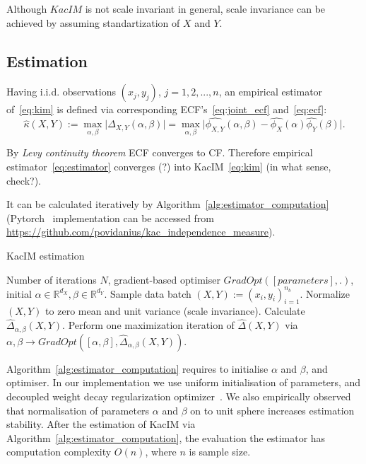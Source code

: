 \documentclass{article}
\begin{document}
Although $KacIM$ is not scale invariant in general, scale invariance can be achieved by assuming standartization of $X$ and $Y$.


\subsection{Estimation}

Having i.i.d. observations $(x_{j}, y_{j})$, $j = 1,2,...,n$, an empirical estimator of~\eqref{eq:kim} is defined via corresponding ECF's~\eqref{eq:joint_ecf} and~\eqref{eq:ecf}:
\begin{equation}
\label{eq:estimator}
\hat{\kappa}(X,Y) := \max_{\alpha, \beta} \vert \widehat{\Delta}_{X,Y}(\alpha, \beta) \vert =\max_{\alpha, \beta} \vert \widehat{\phi_{X,Y}}(\alpha,\beta)  - \widehat{\phi_{X}}(\alpha) \widehat{\phi_{Y}}(\beta) \vert.
\end{equation}

\noindent By \textit{Levy continuity theorem} \cite{LCT} ECF converges to CF. Therefore empirical estimator~\eqref{eq:estimator} converges (?) into KacIM~\eqref{eq:kim} (in what sense, check?).

\noindent It can be calculated iteratively by Algorithm~\ref{alg:estimator_computation} (Pytorch~\cite{NEURIPS2019_9015} implementation can be accessed from \url{https://github.com/povidanius/kac_independence_measure}). 


\begin{algorithm}
	\caption{KacIM estimation}\label{alg:estimator_computation}
	\begin{algorithmic}
		\Require Number of iterations $N$, gradient-based optimiser $GradOpt([parameters],.)$, initial $\alpha \in \mathbb{R}^{d_{X}}, \beta \in \mathbb{R}^{d_{Y}}$.
		\State Sample data batch $(X,Y):=(x_{i},y_{i})_{i=1}^{n_{b}}$.
		\State Normalize $(X,Y)$ to zero mean and unit variance (scale invariance).
		\State Calculate  $\widehat{\Delta}_{\alpha, \beta}(X,Y)$.
		\State Perform one maximization iteration of $\widehat{\Delta}(X,Y)$ via $\alpha, \beta \rightarrow GradOpt([\alpha, \beta], \widehat{\Delta}_{\alpha, \beta}(X,Y))$.
		\EndFor
	\end{algorithmic}
\end{algorithm}



Algorithm~\ref{alg:estimator_computation} requires to initialise $\alpha$ and $\beta$, and optimiser. In our implementation we use uniform initialisation of parameters, and decoupled weight decay regularization optimizer~\cite{Loshchilov2019DecoupledWD}. 
We also empirically observed that normalisation of parameters $\alpha$ and $\beta$ on to unit sphere increases estimation stability. After the estimation of KacIM via Algorithm~\ref{alg:estimator_computation}, the evaluation the estimator  has computation complexity $O(n)$, where $n$ is sample size.
\end{document}
